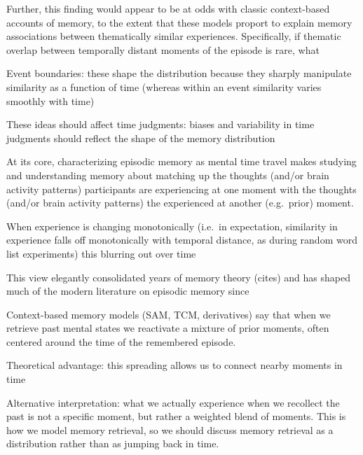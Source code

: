 
Further, this finding would appear to be at odds with classic context-based accounts of memory, to the extent that these models proport to explain memory associations between thematically similar experiences.  Specifically, if thematic overlap between temporally distant moments of the episode is rare, what 


\item Event boundaries: these shape the distribution because they sharply manipulate similarity as a function of time (whereas within an event similarity varies smoothly with time)
\item These ideas should affect time judgments: biases and variability in time judgments should reflect the shape of the memory distribution


At its core, characterizing episodic memory as mental time travel makes studying and understanding memory about matching up the thoughts (and/or brain activity patterns) participants are experiencing at one moment with the thoughts (and/or brain activity patterns) the experienced at another (e.g.\ prior) moment.

When experience is changing monotonically (i.e.\ in expectation, similarity in experience falls off monotonically with temporal distance, as during random word list experiments) this blurring out over time 

\item This view elegantly consolidated years of memory theory (cites) and has shaped much of the modern literature on episodic memory since
\item Context-based memory models (SAM, TCM, derivatives) say that when we retrieve past mental states we reactivate a mixture of prior moments, often centered around the time of the remembered episode.
\item Theoretical advantage: this spreading allows us to connect nearby moments in time
\item Alternative interpretation: what we actually experience when we recollect the past is  not a specific moment, but rather a weighted blend of moments.  This is how we model memory retrieval, so we should discuss memory retrieval as a distribution rather than as jumping back in time.
